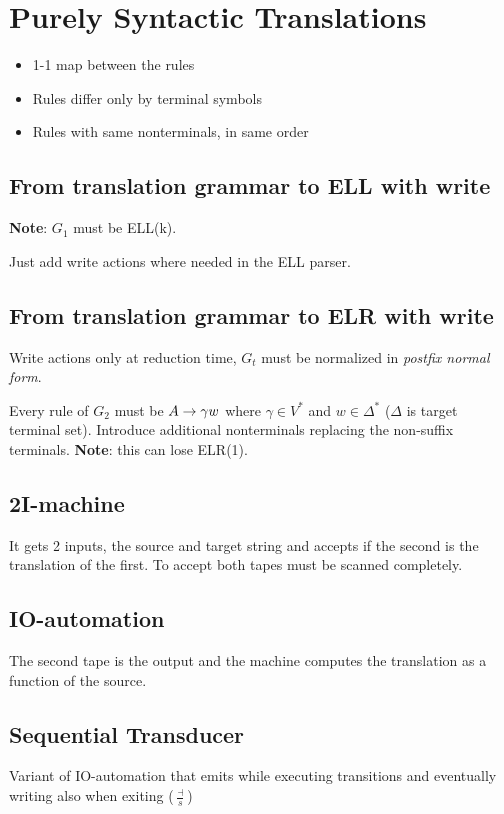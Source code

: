 \section{Purely Syntactic Translations}

\begin{itemize}
    \item 1-1 map between the rules
    \item Rules differ only by terminal symbols
    \item Rules with same nonterminals, in same order
\end{itemize}

\subsection{From translation grammar to ELL with write}
\textbf{Note}: $G_1$ must be ELL(k).

Just add write actions where needed in the ELL parser.

\subsection{From translation grammar to ELR with write}
Write actions only at reduction time, $G_t$ must be normalized in \emph{postfix normal form}.

Every rule of $G_2$ must be $A \rightarrow \gamma w$ where $\gamma\in V^*$ and $w \in \Delta^*$ ($\Delta$ is target terminal set). Introduce additional nonterminals replacing the non-suffix terminals. \textbf{Note}: this can lose ELR(1).

\subsection{2I-machine}

It gets 2 inputs, the source and target string and accepts if the second is the translation of the first. To accept both tapes must be scanned completely.

\subsection{IO-automation}

The second tape is the output and the machine computes the translation as a function of the source.

\subsection{Sequential Transducer}

Variant of IO-automation that emits while executing transitions and eventually writing also when exiting ($\frac{\dashv}{s}$)
